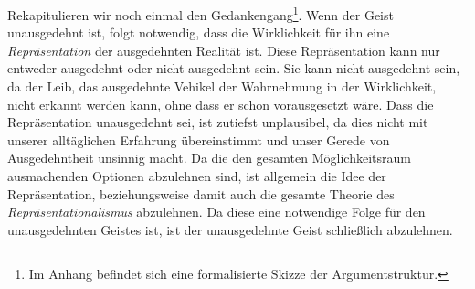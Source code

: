 \documentclass[a4paper, 12pt]{article}
\begin{document}
\begin{onehalfspace}
\noindent Rekapitulieren wir noch einmal den Gedankengang\footnote{Im Anhang befindet sich eine formalisierte Skizze der Argumentstruktur.}. Wenn der Geist unausgedehnt ist, folgt notwendig, dass die Wirklichkeit für ihn eine \emph{Repräsentation} der ausgedehnten Realität ist. Diese Repräsentation kann nur entweder ausgedehnt oder nicht ausgedehnt sein. Sie kann nicht ausgedehnt sein, da der Leib, das ausgedehnte Vehikel der Wahrnehmung in der Wirklichkeit, nicht erkannt werden kann, ohne dass er schon vorausgesetzt wäre. Dass die Repräsentation unausgedehnt sei, ist zutiefst unplausibel, da dies nicht mit unserer alltäglichen Erfahrung übereinstimmt und unser Gerede von Ausgedehntheit unsinnig macht. Da die den gesamten Möglichkeitsraum ausmachenden Optionen abzulehnen sind, ist allgemein die Idee der Repräsentation, beziehungsweise damit auch die gesamte Theorie des \emph{Repräsentationalismus} abzulehnen. Da diese eine notwendige Folge für den unausgedehnten Geistes ist, ist der unausgedehnte Geist schließlich abzulehnen.











\end{onehalfspace}
\end{document}
